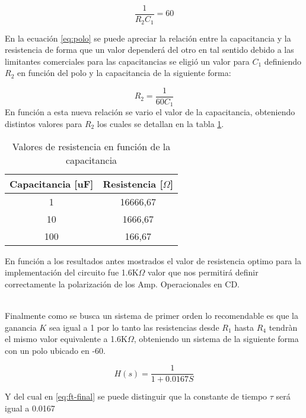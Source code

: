 \documentclass[conference]{IEEEtran}
\begin{document}
	\begin{equation}
		\frac{1}{R_2 C_1} = 60
		\label{eq:polo}
	\end{equation}
	
	En la ecuación \ref{eq:polo} se puede apreciar la relación entre la capacitancia y la resistencia de forma que un valor dependerá del otro en tal sentido debido a las limitantes comerciales para las capacitancias se eligió un valor para $C_1$ definiendo $R_2$ en función del polo y la capacitancia de la siguiente forma:
	
	\begin{equation}
		R_2 = \frac{1}{60 C_1}
		\label{eq:calc-resistencia}
	\end{equation}
	En función a esta nueva relación se vario el valor de la capacitancia, obteniendo distintos valores para $R_2$ los cuales se detallan en la tabla \ref{tab:resistencias}.
	
	\begin{table}[h]
		\centering
		\begin{tabular}{|c|c|}
			\hline
			\textbf{Capacitancia [uF]} & \textbf{Resistencia [$\Omega$]} \\ \hline
			1           & 16666,67             \\ \hline
			10          & 1666,67             \\ \hline
			100         & 166,67             \\ \hline
		\end{tabular}
		\caption{Valores de resistencia en función de la capacitancia}
		\label{tab:resistencias}
	\end{table}
	
	En función a los resultados antes mostrados el valor de resistencia optimo para la implementación del circuito fue 1.6K$\Omega$ valor que nos permitirá definir correctamente la polarización de los Amp. Operacionales en CD. \\\
	
	Finalmente como se busca un sistema de primer orden lo recomendable es que la ganancia $K$ sea igual a 1 por lo tanto las resistencias desde $R_1$ hasta $R_4$ tendràn el mismo valor equivalente a 1.6K$\Omega$, obteniendo un sistema de la siguiente forma con un polo ubicado en -60.
	
	\begin{equation}
		H(s) = \frac{1}{1 + 0.0167S}
		\label{eq:ft-final}
	\end{equation}
	
	Y del cual en \ref{eq:ft-final} se puede distinguir que la constante de tiempo $\tau$ será igual a 0.0167
	
\end{document}
